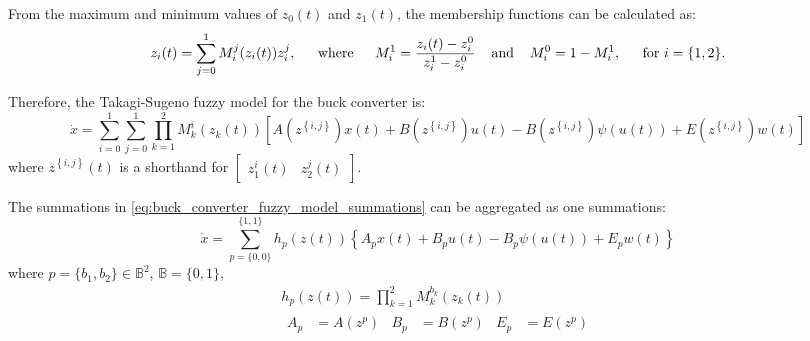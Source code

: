 From the maximum and minimum values of $z_0(t)$ and $z_1(t)$, the membership functions can be calculated as:
\begin{equation}
  z_i(t) = \sum\limits_{j = 0}^{1} M_i^{j}(z_i(t)) z_i^{j}, \hspace{12pt} \ \mathrm{where }\ 
  \hspace{12pt} M_i^1 = \frac{z_i(t) - z_i^0}{z_i^1 - z_i^0} \hspace{8pt} \ \mathrm{and}\  \hspace{8pt}
  M_i^0 = 1 - M_i^1,
  \hspace{12pt} \ \mathrm{for}\  i = \{1,2\}.
\end{equation}

Therefore, the Takagi-Sugeno fuzzy model for the buck converter is:
\begin{equation}
  \dot x = \sum\limits_{i=0}^1 \sum\limits_{j=0}^1 \prod\limits_{k=1}^2 M_k^i(z_k(t))
  \left[
    A\left(z^{\left\{i,j\right\}}\right) x(t) +
    B\left(z^{\left\{i,j\right\}}\right) u(t) -
    B\left(z^{\left\{i,j\right\}}\right) \psi(u(t)) +
    E\left(z^{\left\{i,j\right\}}\right) w(t)
  \right]
  \label{eq:buck_converter_fuzzy_model_summations}
\end{equation}
where $z^{\left\{i,j\right\}}(t)$ is a shorthand for $\begin{bmatrix} z_1^i(t) & z_2^j(t) \end{bmatrix}$.

The summations in \eqref{eq:buck_converter_fuzzy_model_summations} can be aggregated as one summations:
\begin{equation}
  \dot x = \sum\limits_{p=\{0,0\}}^{\{1,1\}} h_p(z(t))
  \left\{A_p x(t) + B_p u(t) - B_p \psi(u(t)) + E_p w(t)\right\}
\end{equation}
where $p = \{b_1, b_2\} \in \mathbb{B}^2$, $\mathbb{B} = \{0,1\}$, 
\begin{gather}
  h_p(z(t)) = \prod\limits_{k=1}^2 M_k^{b_k} (z_k(t)) \\
  \begin{align}
    A_p &= A(z^p) & B_p &= B(z^p) & E_p &= E(z^p)
  \end{align}
\end{gather}
